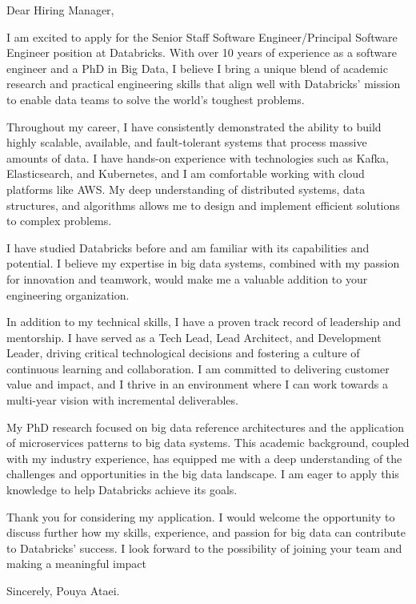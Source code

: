 \documentclass[10pt,a4paper,ragged2e]{altacv}
\begin{document}


\vspace{1em} %

Dear Hiring Manager,

I am excited to apply for the Senior Staff Software Engineer/Principal Software Engineer position at Databricks. With over 10 years of experience as a software engineer and a PhD in Big Data, I believe I bring a unique blend of academic research and practical engineering skills that align well with Databricks' mission to enable data teams to solve the world's toughest problems.

Throughout my career, I have consistently demonstrated the ability to build highly scalable, available, and fault-tolerant systems that process massive amounts of data. I have hands-on experience with technologies such as Kafka, Elasticsearch, and Kubernetes, and I am comfortable working with cloud platforms like AWS. My deep understanding of distributed systems, data structures, and algorithms allows me to design and implement efficient solutions to complex problems.

I have studied Databricks before and am familiar with its capabilities and potential. I believe my expertise in big data systems, combined with my passion for innovation and teamwork, would make me a valuable addition to your engineering organization.

In addition to my technical skills, I have a proven track record of leadership and mentorship. I have served as a Tech Lead, Lead Architect, and Development Leader, driving critical technological decisions and fostering a culture of continuous learning and collaboration. I am committed to delivering customer value and impact, and I thrive in an environment where I can work towards a multi-year vision with incremental deliverables.

My PhD research focused on big data reference architectures and the application of microservices patterns to big data systems. This academic background, coupled with my industry experience, has equipped me with a deep understanding of the challenges and opportunities in the big data landscape. I am eager to apply this knowledge to help Databricks achieve its goals.

Thank you for considering my application. I would welcome the opportunity to discuss further how my skills, experience, and passion for big data can contribute to Databricks' success. I look forward to the possibility of joining your team and making a meaningful impact


\vspace{2em} %

Sincerely, \newline
Pouya Ataei.
\end{document}

